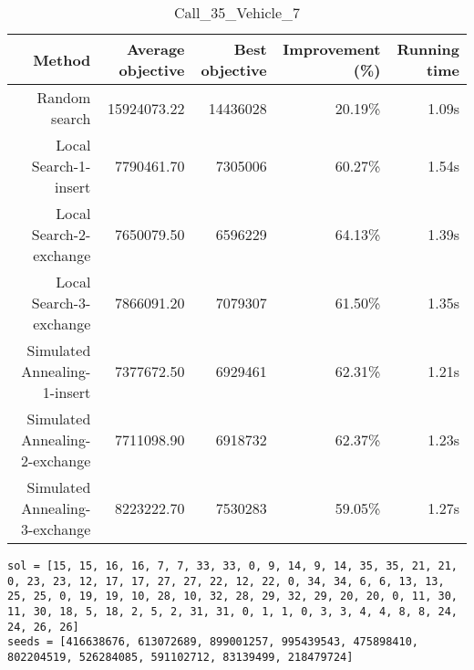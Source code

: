 \begin{table}[ht]
\centering
\caption{Call\_35\_Vehicle\_7}
\label{tab:call35vehicle7}
\begin{tabular}{|r|r|r|r|r|}
Method & Average objective & Best objective & Improvement (\%) & Running time \\
\hline
Random search & 15924073.22 & 14436028 & 20.19\% & 1.09s\\
Local Search-1-insert & 7790461.70 & 7305006 & 60.27\% & 1.54s\\
Local Search-2-exchange & 7650079.50 & 6596229 & 64.13\% & 1.39s\\
Local Search-3-exchange & 7866091.20 & 7079307 & 61.50\% & 1.35s\\
Simulated Annealing-1-insert & 7377672.50 & 6929461 & 62.31\% & 1.21s\\
Simulated Annealing-2-exchange & 7711098.90 & 6918732 & 62.37\% & 1.23s\\
Simulated Annealing-3-exchange & 8223222.70 & 7530283 & 59.05\% & 1.27s\\
\end{tabular}%
\end{table}
\begin{lstlisting}[label={lst:call35vehicle7},caption=Optimal solution call\_35\_vehicle\_7]
sol = [15, 15, 16, 16, 7, 7, 33, 33, 0, 9, 14, 9, 14, 35, 35, 21, 21, 0, 23, 23, 12, 17, 17, 27, 27, 22, 12, 22, 0, 34, 34, 6, 6, 13, 13, 25, 25, 0, 19, 19, 10, 28, 10, 32, 28, 29, 32, 29, 20, 20, 0, 11, 30, 11, 30, 18, 5, 18, 2, 5, 2, 31, 31, 0, 1, 1, 0, 3, 3, 4, 4, 8, 8, 24, 24, 26, 26]
seeds = [416638676, 613072689, 899001257, 995439543, 475898410, 802204519, 526284085, 591102712, 83139499, 218479724]
\end{lstlisting}%
\clearpage


